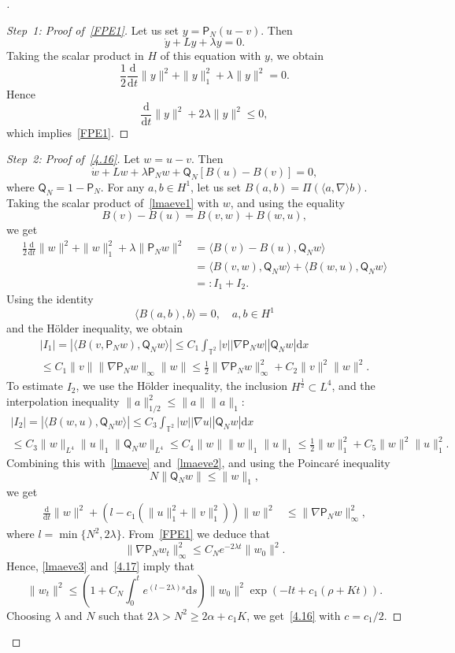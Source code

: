 \documentclass[10pt]{amsart}
\theoremstyle{definition}\newtheorem{defi}[theo]{Definition}\newtheorem{rema}[theo]{Remark}\newtheorem{exam}[theo]{Example}\newtheorem{exem}[theo]{Example}\newtheorem{nota}[theo]{Notation}
\newcommand{\T}{{\mathbb T}}
\newcommand{\la}{\lambda}
\newcommand{\ty}{\infty}
\newcommand{\pp}{{{\mathsf P}_N}}
\newcommand{\qq}{{{\mathsf Q}_N}}
\newcommand{\lag}{\langle}
\newcommand{\rag}{\rangle}
\newcommand{\dd}{\mathrm{d}}
\newenvironment{step}{\begin{proof}}{\let\qed\relax \end{proof}}
\newenvironment{proofc}[1][\proofname]{\begin{proof}[{#1}]}{\end{proof}}
\begin{document}
\begin{proofc}

\begin{step}[Step~1: Proof of~\eqref{FPE1}]
Let us set $y= \pp(u-v)$. Then
\[
\dot y +L y +\la y =0.
\]
Taking the scalar product in $H$ of this equation with $y$, we obtain
\[
\frac12\frac{\dd}{\dd t} \|y\|^2+\|y\|_1^2+\la \| y\|^2=0.
\]
Hence
\[
\frac{\dd}{\dd t} \|y\|^2 +2\la \| y\|^2\le0,
\]
which implies~\eqref{FPE1}.
\end{step}

\begin{proof}[Step~2: Proof of~\eqref{4.16}]
Let $w= u-v$. Then
\begin{equation}\label{lmaeve1}
\dot w+Lw+\la \pp w+ \qq[B(u)-B(v)]=0,
\end{equation}
where $\qq=1-\pp$. For any $a, b \in H^1$, let us set $B(a,b)=\Pi(\langle a,\nabla \rangle b)$. Taking the scalar product of~\eqref{lmaeve1} with $w$, and using the equality
\begin{equation}\label{ezecsd}
B(v)-B(u)=B(v,w)+B(w,u),
\end{equation}
we get
\begin{align}\label{lmaeve}
\frac12\frac{\dd}{\dd t} \|w\|^2+\|w\|_1^2+\la \| \pp w\|^2&= \lag B(v)-B(u),\qq w\rag\nonumber\\&= \lag B(v,w),\qq w\rag+ \lag B(w,u),\qq w\rag\nonumber\\&=:I_1+I_2.
\end{align}
Using the identity
\[
\lag B(a,b),b\rag=0, \quad a,b\in H^1
\]
and the H\"older inequality, we obtain
\begin{multline}\label{lmaeve2}
|I_1|=| \lag B(v, \pp w), \qq w\rag| \le C_1\int_{\T^2} |v| |\nabla \pp w|| \qq w| \dd x \\
\le C_1\|v\| \|\nabla\pp w\|_{\ty} \| w\| \le \frac12 \|\nabla\pp w\|_{\ty}^2+C_2 \|v\|^2 \|w\|^2.
\end{multline}
To estimate $I_2$, we use the H\"older inequality, the inclusion $H^{\frac12}\subset L^4$, and the interpolation inequality $\|a\|_{1/2}^2\le \|a\|\|a\|_1$:
\begin{multline*}
|I_2|=|\lag B(w,u),\qq w\rag|\le C_3\int_{\T^2} |w||\nabla u| |\qq w| \dd x\\
\le C_3 \|w\|_{L^4} \|u\|_1 \|\qq w\|_{L^4} \le C_4 \|w\|\|w\|_1 \|u\|_1\le \frac12 \|w\|_1^2 + C_5 \|w\|^2 \|u\|_1^2.
\end{multline*}
Combining this with~\eqref{lmaeve} and~\eqref{lmaeve2}, and using the Poincar\'e inequality
\[
N\|\qq w\|\le \|w\|_1,
\]
we get
\begin{align}\label{lmaeve3}
\frac{\dd}{\dd t} \|w\|^2+\left(l-c_1(\| u\|_1^2+\| v\|_1^2)\right)\|w\|^2 &\le \|\nabla\pp w\|_{\ty}^2,
\end{align}
where $l=\min\{N^2, 2\la\} $. From~\eqref{FPE1} we deduce that
\[
\|\nabla\pp w_t\|_{\ty}^2\le C_N e^{-2\la t}\|w_0\|^2.
\]
Hence, \eqref{lmaeve3} and~\eqref{4.17} imply that
\[
\|w_t\|^2\le \left(1+ C_N \int_0^t e^{(l-2\la)s} \dd s\right) \|w_0\|^2\exp\left(-l t+c_1 (\rho+Kt)\right).
\]
Choosing $\la$ and $N$ such that $2\la> N^2\ge 2\alpha +c_1K$, we get~\eqref{4.16} with $c=c_1/2$.
\end{proof}
\let\qed\relax
\end{proofc}
\end{document}
